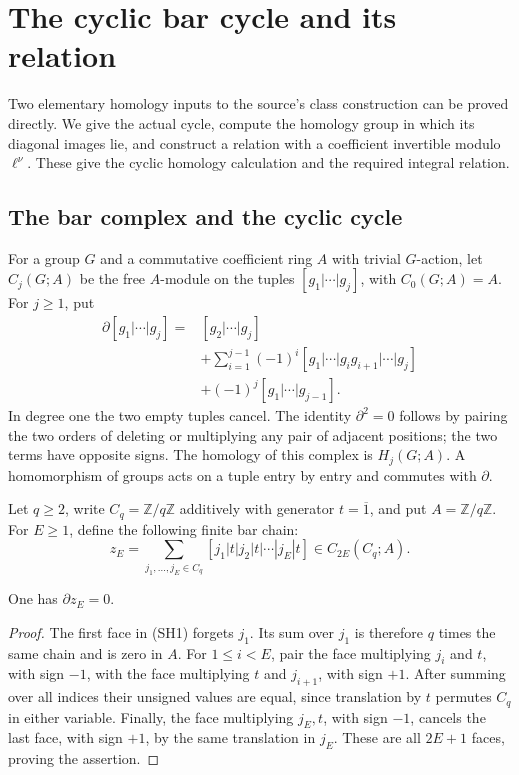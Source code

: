 \section{The cyclic bar cycle and its relation}
\label{sh-section}

Two elementary homology inputs to the source's class construction
can be proved directly.  We give the actual cycle, compute the
homology group in which its diagonal images lie, and construct
a relation with a coefficient invertible modulo \(\ell^\nu\).
These give the cyclic homology calculation and the required
integral relation.\cite{alpo-uniform-source}

\subsection{The bar complex and the cyclic cycle}

For a group \(G\) and a commutative coefficient ring \(A\)
with trivial \(G\)-action, let \(C_j(G;A)\) be the free
\(A\)-module on the tuples
\([g_1|\cdots|g_j]\), with \(C_0(G;A)=A\).
For \(j\ge1\), put
\[
\begin{split}
 \partial[g_1|\cdots|g_j]
 ={}&[g_2|\cdots|g_j]\\
 &+\sum_{i=1}^{j-1}(-1)^i
       [g_1|\cdots|g_ig_{i+1}|\cdots|g_j]\\
 &+(-1)^j[g_1|\cdots|g_{j-1}].
\end{split}
\tag{SH1}
\]
In degree one the two empty tuples cancel.
The identity \(\partial^2=0\) follows by pairing the
two orders of deleting or multiplying any pair of
adjacent positions; the two terms have opposite signs.
The homology of this complex is \(H_j(G;A)\).
A homomorphism of groups acts on a tuple entry by entry
and commutes with \(\partial\).

Let \(q\ge2\), write \(C_q=\mathbb Z/q\mathbb Z\)
additively with generator \(t=\overline1\), and put
\(A=\mathbb Z/q\mathbb Z\).
For \(E\ge1\), define the following finite bar chain:
\[
 z_E=\sum_{j_1,\ldots,j_E\in C_q}
              [j_1|t|j_2|t|\cdots|j_E|t]
                   \in C_{2E}(C_q;A).
 \tag{SH2}
\]

\begin{lemma}\label{sh-cycle}
One has \(\partial z_E=0\).
\end{lemma}
\begin{proof}
The first face in (SH1) forgets \(j_1\).  Its sum over
\(j_1\) is therefore \(q\) times the same chain and is
zero in \(A\).
For \(1\le i<E\), pair the face multiplying
\(j_i\) and \(t\), with sign \(-1\), with the face
multiplying \(t\) and \(j_{i+1}\), with sign \(+1\).
After summing over all indices their unsigned values
are equal, since translation by \(t\) permutes \(C_q\)
in either variable.
Finally, the face multiplying \(j_E,t\), with sign
\(-1\), cancels the last face, with sign \(+1\),
by the same translation in \(j_E\).
These are all \(2E+1\) faces, proving the assertion.
\end{proof}

